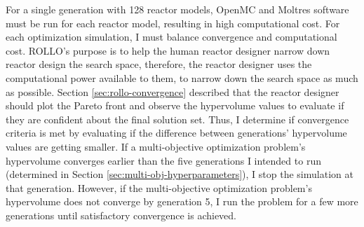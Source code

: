 For a single generation with 128 reactor models, OpenMC and Moltres software must be 
run for each reactor model, resulting in high computational cost. 
For each optimization simulation, I must balance convergence and computational cost.
\gls{ROLLO}'s purpose is to help the human reactor designer narrow down reactor design 
the search space, therefore, the reactor designer uses the computational 
power available to them, to narrow down the search space as much as possible. 
Section \ref{sec:rollo-convergence} described that the reactor designer should 
plot the Pareto front and observe the hypervolume values to evaluate if they are 
confident about the final solution set.  
Thus, I determine if convergence criteria is met by evaluating if the difference 
between generations' hypervolume values are getting smaller. 
If a multi-objective optimization problem's hypervolume converges earlier than the 
five generations I intended to run (determined in Section 
\ref{sec:multi-obj-hyperparameters}), I stop the simulation at that generation. 
However, if the multi-objective optimization problem's hypervolume does not converge by 
generation 5, I run the problem for a few more generations until satisfactory 
convergence is achieved.

